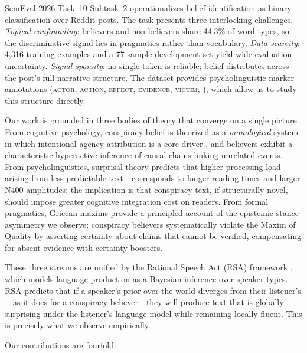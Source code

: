 \documentclass[11pt]{article}
\begin{document}
SemEval-2026 Task~10 Subtask~2 \citep[PsyCoMark;][]{samory-etal-2026-semeval}
operationalizes belief identification as binary classification over Reddit
posts.
The task presents three interlocking challenges.
\emph{Topical confounding}: believers and non-believers share 44.3\% of
word types, so the discriminative signal lies in pragmatics rather than
vocabulary.
\emph{Data scarcity}: 4,316 training examples and a 77-sample development
set yield wide evaluation uncertainty.
\emph{Signal sparsity}: no single token is reliable; belief distributes
across the post's full narrative structure.
The dataset provides psycholinguistic marker annotations
(\textsc{actor}, \textsc{action}, \textsc{effect}, \textsc{evidence},
\textsc{victim}; \citealt{samory2018conspiracy}), which allow us to
study this structure directly.

Our work is grounded in three bodies of theory that converge on a single
picture.
From cognitive psychology, conspiracy belief is theorized as a
\emph{monological} system \citep{goertzel1994belief} in which intentional
agency attribution is a core driver
\citep{douglas2019understanding,van2022misinformation}, and believers
exhibit a characteristic hyperactive inference of causal chains
linking unrelated events.
From psycholinguistics, surprisal theory
\citep{levy2008expectation,smith2013effect} predicts that higher
processing load---arising from less predictable text---corresponds to
longer reading times and larger N400 amplitudes; the implication is
that conspiracy text, if structurally novel, should impose greater
cognitive integration cost on readers.
From formal pragmatics, Gricean maxims
\citep{grice1975logic,levinson1983pragmatics} provide a principled
account of the epistemic stance asymmetry we observe: conspiracy
believers systematically violate the Maxim of Quality by asserting
certainty about claims that cannot be verified, compensating for
absent evidence with certainty boosters.

These three streams are unified by the Rational Speech Act (RSA)
framework \citep{goodman2016pragmatics,frank2012predicting}, which
models language production as a Bayesian inference over speaker types.
RSA predicts that if a speaker's prior over the world diverges from
their listener's---as it does for a conspiracy believer---they will
produce text that is globally surprising under the listener's language
model while remaining locally fluent.
This is precisely what we observe empirically.

Our contributions are fourfold:
\end{document}
